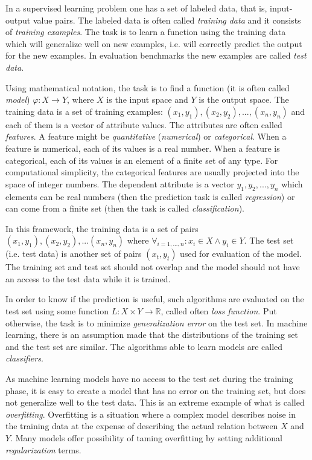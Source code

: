 \documentclass{pracamgr}
\begin{document}
In a supervised learning problem one has a set of labeled data, that is, input-output 
value pairs. The labeled data is often called \textit{training data} and it consists
of \textit{training examples}. The task is to learn a function using the training data 
which will generalize well on new examples, i.e. will correctly predict the output for
the new examples. In evaluation benchmarks the new examples are called \textit{test data}.

Using mathematical notation, the task is to find a function (it is often called \textit{model})
$\varphi: X \rightarrow Y$, where $X$ is the input space and $Y$ is the output space.
The training data is a set of training examples:
$(x_{1}, y_{1}), (x_{2}, y_{2}), ..., (x_{n}, y_{n})$ and each of them is a vector of attribute values. The attributes
are often called \textit{features}. A feature might be
\textit{quantitative} (\textit{numerical}) or \textit{categorical}. When a feature is
numerical, each of its values is a real number. When a feature
is categorical, each of its values is an element of a finite set of any type.
For computational simplicity, the categorical features are usually projected into the space
of integer numbers. The dependent attribute is a vector $y_{1}, y_{2}, ..., y_{n}$ which elements
can be real numbers (then the prediction task is called \textit{regression}) or can come from a finite 
set (then the task is called \textit{classification}).

In this framework, the training data is a set of pairs $(x_{1}, y_{1}), (x_{2}, y_{2}), ...
(x_{n}, y_{n})$ where $\forall_{i=1,...,n}: x_{i}\in X \wedge y_{i}\in Y$. The test set (i.e. test data) is
another set of pairs $(x_{t}, y_{t})$ used for evaluation of the model. 
The training set and test set should not overlap and the model should not have an access to
the test data while it is trained.

In order to know if the prediction is useful, such algorithms are evaluated on the test set
using some function $L: X \times Y \rightarrow \mathbb{R}$, called often
\textit{loss function}. Put otherwise, the task is to minimize \textit{generalization error}
on the test set. In machine learning, there is an assumption made that the distributions of the training set
and the test set are similar. The algorithms able to learn models are called
\textit{classifiers}.

As machine learning models have no access to the test set during the training phase, it is
easy to create a model that has no error on the training set, but does not generalize well
to the test data. This is an extreme example of what is called \textit{overfitting}. 
Overfitting is a situation where a complex model describes noise in the training data
at the expense of describing the actual relation between $X$ and $Y$.
Many models offer possibility of taming overfitting by setting additional \textit{regularization} terms.
\end{document}

